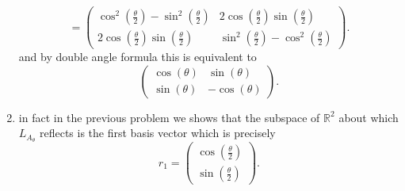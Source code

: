 \documentclass{article}
\begin{document}
\begin{enumerate}[label = (\alph*)]
\[            =
            \begin{pmatrix} 
                \cos^2(\frac{\theta}{2}) - \sin^2(\frac{\theta}{2}) & 2\cos(\frac{\theta}{2})\sin(\frac{\theta}{2})\\
                2\cos(\frac{\theta}{2})\sin(\frac{\theta}{2}) & \sin^2(\frac{\theta}{2}) - \cos^2(\frac{\theta}{2})
            \end{pmatrix} 
        .\] 
        and by double angle formula this is equivalent to
        \[
        \begin{pmatrix} 
            \cos(\theta) & \sin(\theta) \\
            \sin(\theta) & -\cos(\theta)
        \end{pmatrix} 
        .\] 
    \item in fact in the previous problem we shows that the subspace of $ \mathbb{R}^2$ about which $L_{A_{\theta}}$ reflects
        is the first basis vector which is precisely
        \[
        r_1 = \begin{pmatrix} \cos(\frac{\theta}{2}) \\ \sin(\frac{\theta}{2}) \end{pmatrix} 
        .\] 
    \end{enumerate}
\end{document}
